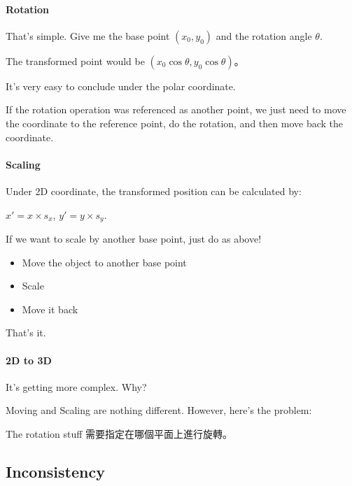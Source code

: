 \documentclass[
]{article}
\begin{document}
\hypertarget{header-n89}{%
\paragraph{Rotation}\label{header-n89}}

That's simple. Give me the base point \((x_0, y_0)\) and the rotation
angle \(\theta\).

The transformed point would be \((x_0\cos\theta, y_0\cos\theta)\)。

It's very easy to conclude under the polar coordinate.

If the rotation operation was referenced as another point, we just need
to move the coordinate to the reference point, do the rotation, and then
move back the coordinate.

\hypertarget{header-n94}{%
\paragraph{Scaling}\label{header-n94}}

Under 2D coordinate, the transformed position can be calculated by:

\(x' = x \times s_x\), \(y' = y \times s_y\).

If we want to scale by another base point, just do as above!

\begin{itemize}
\item
  Move the object to another base point
\item
  Scale
\item
  Move it back
\end{itemize}

That's it.

\hypertarget{header-n106}{%
\paragraph{2D to 3D}\label{header-n106}}

It's getting more complex. Why?

Moving and Scaling are nothing different. However, here's the problem:

The rotation stuff 需要指定在哪個平面上進行旋轉。

\hypertarget{header-n110}{%
\subsection{Inconsistency}\label{header-n110}}
\end{document}

